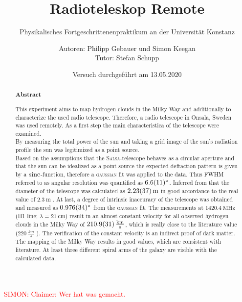 \title{ Radioteleskop Remote}
\subtitle{Physikalisches Fortgeschrittenenpraktikum an der Universität Konstanz}
\author{Autoren: Philipp Gebauer und Simon Keegan \\ \large{Tutor: Stefan Schupp}}
\date{Versuch durchgeführt am 13.05.2020}
\maketitle
\vspace{1.5 cm}
\begin{abstract}
    \begin{center}
        \Large{\textsf{\textbf{Abstract}}}
    \end{center}
    \vspace{0.75 cm}
    \begin{singlespace}
    \noindent This experiment aims to map hydrogen clouds in the Milky Way and additionally to characterize the used radio telescope.
    Therefore, a radio telescope in Onsala, Sweden was used remotely.
    As a first step the main characteristica of the telescope were examined.\\
    By measuring the total power of the sun and taking a grid image of the sun's radiation profile the sun was legitimized as a point source. \\
    Based on the assumptions that the \textsc{Salsa}-telescope behaves as a circular aperture and that the sun can be idealized as a point source the expected defraction pattern is given by a $\operatorname{sinc}$-function, therefore a \textsc{gaussian} fit was applied to the data.
    Thus FWHM referred to as angular resolution was quantified as $\SI{6.6 \pm 1.1}{\degree}$.
    Inferred from that the diameter of the telescope was calculated as $\SI{2.23 \pm 0.37}{\metre}$ in good accordance to the real value of $\SI{2.3}{\metre}$ \cite{Usermanual}.
    At last, a degree of intrinsic inaccuracy of the telescope was obtained and measured as $\SI{0.976 \pm 0.034}{\degree}$ from the \textsc{gaussian} fit.\newline
    The measurements at $\SI{1420.4}{\mega \hertz}$ (H1 line; $\lambda = \SI{21}{\centi \metre}$) result in an almost constant velocity for all observed hydrogen clouds in the Milky Way of $\SI{210.9 \pm 3.1}{\frac{km}{s}}$, which is really close to the literature value ($\SI{220}{\frac{km}{s}}$ \cite{LSR}).
    The verification of the constant velocity is an indirect proof of dark matter.\newline
    The mapping of the Milky Way results in good values, which are consistent with literature. 
    At least three different spiral arms of the galaxy are visible with the calculated data.
\end{singlespace}
\end{abstract}

\textcolor{red}{SIMON: Claimer: Wer hat was gemacht.}

\thispagestyle{empty}
\newpage